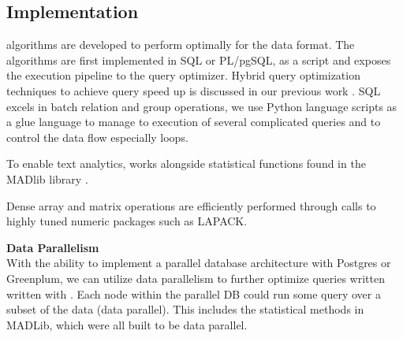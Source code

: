 \subsection{{\system} Implementation}


\system algorithms are developed to perform optimally for the data format.
The algorithms are first implemented in SQL or PL/pgSQL, as a script and 
exposes the execution pipeline to the query optimizer. 
Hybrid query optimization techniques to achieve query speed up is discussed in
our previous work \cite{wang2011hybrid}.
SQL excels in batch relation and group operations, we use Python language
scripts as a glue language to manage to execution of several complicated 
queries and to control the data flow especially loops.


To enable text analytics, {\system} works alongside statistical
functions found in the MADlib library \cite{Cohen:2009:MSN:1687553.1687576}.

Dense array and matrix operations are efficiently performed 
through calls to highly tuned numeric packages such as LAPACK.


\noindent
\textbf{Data Parallelism}\\
With the ability to implement a parallel database architecture with Postgres or 
Greenplum, we can utilize data parallelism to further optimize queries written
written with {\system}. Each node within the parallel DB could run some query
over a subset of the data (data parallel). This includes the statistical methods
in MADLib, which were all built to be data parallel.

